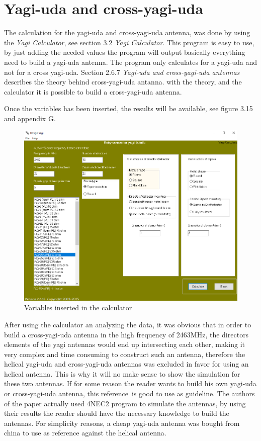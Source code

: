 \newpage

\section{Yagi-uda and cross-yagi-uda}
The calculation for the yagi-uda and cross-yagi-uda antenna, was done by using the \textit{Yagi Calculator}, see section 3.2 \textit{Yagi Calculator}. This program is easy to use, by just adding the needed values the program will output basically everything need to build a yagi-uda antenna. The program only calculates for a yagi-uda and not for a cross yagi-uda. Section 2.6.7 \textit{Yagi-uda and cross-yagi-uda antennas} describes the theory behind cross-yagi-uda antanna. with the theory, and the calculator it is possible to build a cross-yagi-uda antenna.

Once the variables has been inserted, the results will be available, see figure 3.15 and appendix G.

\begin{figure}[h!]
\centering
\includegraphics[scale=0.60]{figures/YagiCalculatorVeriables.PNG}
\caption{Variables inserted in the calculator}
\end{figure}

After using the calculator an analyzing the data, it was obvious that in order to build a cross-yagi-uda antenna in the high frequency of 2463MHz, the directors elements of the yagi antennas would end up intersecting each other, making it very complex and time consuming to construct such an antenna, therefore the helical yagi-uda and cross-yagi-uda antennas was excluded in favor for using an helical antenna. This is why it will no make sense to show the simulation for these two antennas. If for some reason the reader wants to build his own yagi-uda or cross-yagi-uda antenna, this reference\cite{StudyAndDesignYagiCrossAntenna}\ is good to use as guideline. The authors of the paper actually used 4NEC2 program to simulate the antennas, by using their results the reader should have the necessary knowledge to build the antennas. For simplicity reasons, a cheap yagi-uda antenna was bought from china to use as reference against the helical antenna.  

